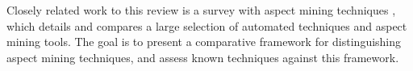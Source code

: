 Closely related work to this review is a survey with aspect mining techniques \cite{Kellens}, which details and compares a large selection of automated techniques and aspect mining tools. The goal is to present a comparative framework for distinguishing aspect mining techniques, and assess known techniques against this framework. 